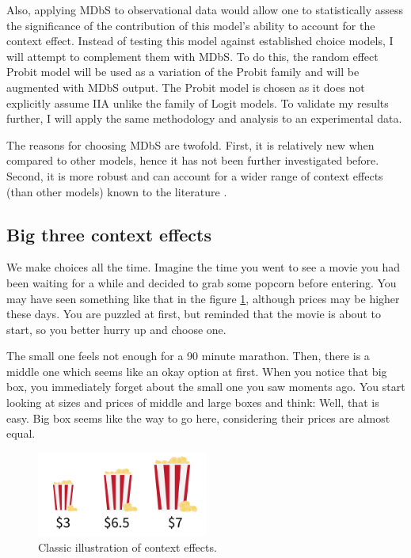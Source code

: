 \documentclass[a4paper,12pt]{article}
\begin{document}
Also, applying MDbS to observational data would allow one to statistically assess the significance of the contribution of this model's ability to account for the context effect. Instead of testing this model against established choice models, I will attempt to complement them with MDbS. To do this, the random effect Probit model will be used as a variation of the Probit family and will be augmented with MDbS output. The Probit model is chosen as it does not explicitly assume IIA unlike the family of Logit models. To validate my results further, I will apply the same methodology and analysis to an experimental data.

The reasons for choosing MDbS are twofold. First, it is relatively new when compared to other models, hence it has not been further investigated before. Second, it is more robust and can account for a wider range of context effects (than other models) known to the literature \citep{noguchi2018multialternative}.


\subsection{Big three context effects}\label{chapter:bigThreeContextEffectsDescription}

We make choices all the time. Imagine the time you went to see a movie you had been waiting for a while and decided to grab some popcorn before entering. You may have seen something like that in the figure \ref{fig:decoyPopcornExample}, although prices may be higher these days. You are puzzled at first, but reminded that the movie is about to start, so you better hurry up and choose one. 

The small one feels not enough for a 90 minute marathon. Then, there is a middle one which seems like an okay option at first. When you notice that big box, you immediately forget about the small one you saw moments ago. You start looking at sizes and prices of middle and large boxes and think: Well, that is easy. Big box seems like the way to go here, considering their prices are almost equal. 


\begin{figure}[H]
    \centering
    \includegraphics[width=0.5\textwidth]{staticFiles/popcornDecoy.png}
    \caption{Classic illustration of context effects.}
    \label{fig:decoyPopcornExample}
\end{figure}
\end{document}
